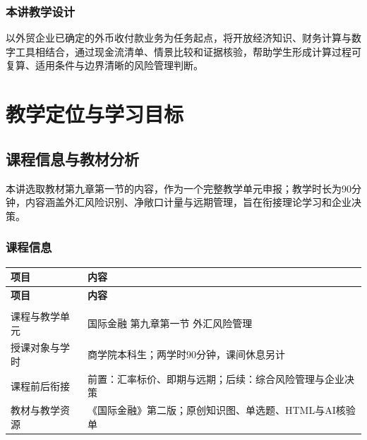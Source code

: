 \documentclass[lang=cn,11pt,oneside,openany,chinesefont=nofont,color=blue,titlestyle=hang]{elegantbook}
\begin{document}
\subsection*{本讲教学设计}
以外贸企业已确定的外币收付款业务为任务起点，将开放经济知识、财务计算与数字工具相结合，通过现金流清单、情景比较和证据核验，帮助学生形成计算过程可复算、适用条件与边界清晰的风险管理判断。
\clearpage
\tableofcontents
\hypersetup{linkcolor=Navy}
\mainmatter


\chapter{教学定位与学习目标}\label{chap:position}

\section{课程信息与教材分析}\label{sec:g2}

本讲选取教材第九章第一节的内容，作为一个完整教学单元申报；教学时长为90分钟，内容涵盖外汇风险识别、净敞口计量与远期管理，旨在衔接理论学习和企业决策。

\subsection*{课程信息}

\begingroup\small{}\setlength{\tabcolsep}{6pt}\renewcommand{\arraystretch}{1.24}
\begin{longtable}{>{\raggedright\arraybackslash}p{}>{\raggedright\arraybackslash}p{}}
\toprule[.8pt]\rowcolor{Navy}
\color{white}\bfseries 项目 & \color{white}\bfseries 内容 \\
\midrule\endfirsthead
\toprule[.8pt]\rowcolor{Navy}
\color{white}\bfseries 项目 & \color{white}\bfseries 内容 \\
\midrule\endhead
\midrule\multicolumn{2}{r}{\footnotesize\color{Muted}续下页}\\\endfoot
\bottomrule[.8pt]\endlastfoot
课程与教学单元 & 国际金融  第九章第一节  外汇风险管理 \\
\midrule[.25pt]
\rowcolor{Pale}
授课对象与学时 & 商学院本科生；两学时90分钟，课间休息另计 \\
\midrule[.25pt]
课程前后衔接 & 前置：汇率标价、即期与远期；后续：综合风险管理与企业决策 \\
\midrule[.25pt]
\rowcolor{Pale}
教材与教学资源 & 《国际金融》第二版；原创知识图、单选题、HTML与AI核验单 \\
\midrule[.25pt]
\end{longtable}\endgroup
\end{document}
